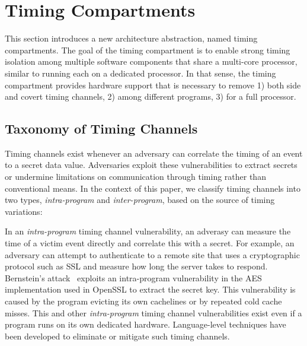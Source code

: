 \section{Timing Compartments}

This section introduces a new architecture abstraction, named timing 
compartments.
The goal of the timing compartment is to enable strong timing isolation
among multiple software components that share a multi-core processor,
similar to running each on a dedicated processor.
In that sense, the timing compartment provides hardware support that is 
necessary to remove 1) both side and covert timing channels, 2) among
different programs, 3) for a full processor.


\subsection{Taxonomy of Timing Channels}

Timing channels exist whenever an adversary can correlate the timing of an event
to a secret data value. Adversaries exploit these vulnerabilities to extract 
secrets or undermine limitations on communication through timing rather than 
conventional means. In the context of this paper, we classify timing channels
into two types, {\em intra-program} and {\em inter-program}, 
based on the source of timing variations:

In an {\em intra-program} timing channel vulnerability, an adverasy can measure 
the time of a victim event directly and correlate this with a secret. For 
example, an adversary can attempt to authenticate to a remote site that uses a 
cryptographic protocol such as SSL and measure how long the server takes to 
respond. Bernstein's attack~\cite{bernstein} exploits an intra-program 
vulnerability in the AES implementation used in OpenSSL to extract the secret 
key. This vulnerability is caused by the program evicting its 
own cachelines or by repeated cold cache misses.
This and other {\em intra-program} timing channel vulnerabilities
exist even if a program runs on its own dedicated hardware.
Language-level techniques have been developed to
eliminate \cite{timesens} or mitigate \cite{mitigation1,mitigation2,mitigation3} 
such timing channels.

